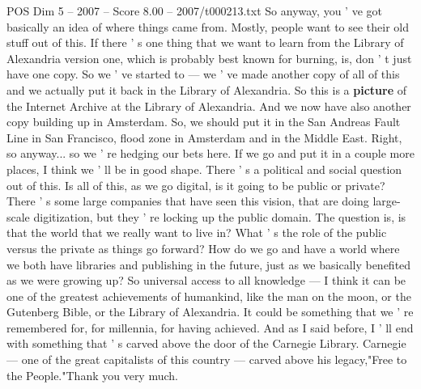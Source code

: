 \begin{textsample}{POS Dim 5 – 2007 – Score 8.00 – 2007/t000213.txt}
So anyway, you ' ve got basically an idea of where things came from.
Mostly, people want to see their old stuff out of this.
If there ' s one thing that we want to learn from the Library of Alexandria version one, which is probably best known for burning, is, don ' t just have one copy.
So we ' ve started to — we ' ve made another copy of all of this and we actually put it back in the Library of Alexandria.
So this is a \textbf{picture} of the Internet Archive at the Library of Alexandria.
And we now have also another copy building up in Amsterdam.
So, we should put it in the San Andreas Fault Line in San Francisco, flood zone in Amsterdam and in the Middle East.
Right, so anyway... so we ' re hedging our bets here.
If we go and put it in a couple more places, I think we ' ll be in good shape.
There ' s a political and social question out of this.
Is all of this, as we go digital, is it going to be public or private?
There ' s some large companies that have seen this vision, that are doing large-scale digitization, but they ' re locking up the public domain.
The question is, is that the world that we really want to live in?
What ' s the role of the public versus the private as things go forward?
How do we go and have a world where we both have libraries and publishing in the future, just as we basically benefited as we were growing up?
So universal access to all knowledge — I think it can be one of the greatest achievements of humankind, like the man on the moon, or the Gutenberg Bible, or the Library of Alexandria.
It could be something that we ' re remembered for, for millennia, for having achieved.
And as I said before, I ' ll end with something that ' s carved above the door of the Carnegie Library.
Carnegie — one of the great capitalists of this country — carved above his legacy,"Free to the People."Thank you very much.

\end{textsample}
